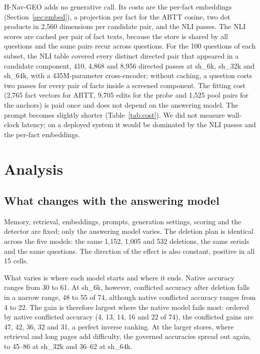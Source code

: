 \documentclass[journal=jcisd8,manuscript=article]{achemso}
\newcommand{\sub}[1]{\textsf{sh\_#1}}                    %
\newcommand{\geo}{H-Nav-GEO}
\begin{document}
\geo{} adds no generative call. Its costs are the per-fact embeddings (Section~\ref{sec:embed}), a projection per fact for the ABTT cosine, two dot products in 2,560 dimensions per candidate pair, and the NLI passes. The NLI scores are cached per pair of fact texts, because the store is shared by all questions and the same pairs recur across questions. For the 100 questions of each subset, the NLI table covered every distinct directed pair that appeared in a candidate component, 410, 4,868 and 8,956 directed passes at \sub{6k}, \sub{32k} and \sub{64k}, with a 435M-parameter cross-encoder; without caching, a question costs two passes for every pair of facts inside a screened component. The fitting cost (2,765 fact vectors for ABTT, 9,705 edits for the probe and 1,525 pool pairs for the anchors) is paid once and does not depend on the answering model. The prompt becomes slightly shorter (Table~\ref{tab:cost}). We did not measure wall-clock latency; on a deployed system it would be dominated by the NLI passes and the per-fact embeddings.

\section{Analysis}
\label{sec:analysis}

\subsection{What changes with the answering model}
\label{sec:substitution}

Memory, retrieval, embeddings, prompts, generation settings, scoring and the detector are fixed; only the answering model varies. The deletion plan is identical across the five models: the same 1,152, 1,005 and 532 deletions, the same serials and the same questions. The direction of the effect is also constant, positive in all 15 cells.

What varies is where each model starts and where it ends. Native accuracy ranges from 30 to 61. At \sub{6k}, however, conflicted accuracy after deletion falls in a narrow range, 48 to 55 of 74, although native conflicted accuracy ranges from 4 to 22. The gain is therefore largest where the native model fails most: ordered by native conflicted accuracy (4, 13, 14, 16 and 22 of 74), the conflicted gains are 47, 42, 36, 32 and 31, a perfect inverse ranking. At the larger stores, where retrieval and long pages add difficulty, the governed accuracies spread out again, to 45--86 at \sub{32k} and 36--62 at \sub{64k}.
\end{document}
